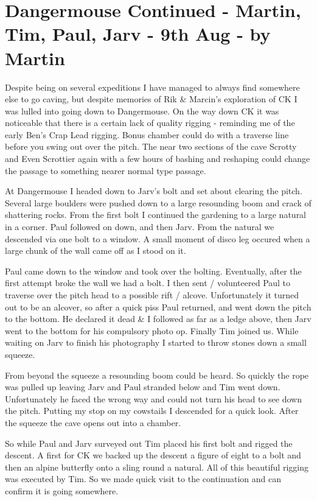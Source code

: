 
\section{Dangermouse Continued - Martin, Tim, Paul, Jarv - 9th Aug - by
Martin}\label{dangermouse-continued---martin-tim-paul-jarv---9th-aug---by-martin}

Despite being on several expeditions I have managed to always find
somewhere else to go caving, but despite memories of Rik \& Marcin's
exploration of CK I was lulled into going down to Dangermouse. On the
way down CK it was noticeable that there is a certain lack of quality
rigging - reminding me of the early Ben's Crap Lead rigging. Bonus
chamber could do with a traverse line before you swing out over the
pitch. The near two sections of the cave Scrotty and Even Scrottier
again with a few hours of bashing and reshaping could change the passage
to something nearer normal type passage.

At Dangermouse I headed down to Jarv's bolt and set about clearing the
pitch. Several large boulders were pushed down to a large resounding
boom and crack of shattering rocks. From the first bolt I continued the
gardening to a large natural in a corner. Paul followed on down, and
then Jarv. From the natural we descended via one bolt to a window. A
small moment of disco leg occured when a large chunk of the wall came
off as I stood on it.

Paul came down to the window and took over the bolting. Eventually,
after the first attempt broke the wall we had a bolt. I then sent /
volunteered Paul to traverse over the pitch head to a possible rift /
alcove. Unfortunately it turned out to be an alcover, so after a quick
piss Paul returned, and went down the pitch to the bottom. He declared
it dead \& I followed as far as a ledge above, then Jarv went to the
bottom for his compulsory photo op. Finally Tim joined us. While waiting
on Jarv to finish his photography I started to throw stones down a small
squeeze.

From beyond the squeeze a resounding boom could be heard. So quickly the
rope was pulled up leaving Jarv and Paul stranded below and Tim went
down. Unfortunately he faced the wrong way and could not turn his head
to see down the pitch. Putting my stop on my cowstails I descended for a
quick look. After the squeeze the cave opens out into a chamber.

So while Paul and Jarv surveyed out Tim placed his first bolt and rigged
the descent. A first for CK we backed up the descent a figure of eight
to a bolt and then an alpine butterfly onto a sling round a natural. All
of this beautiful rigging was executed by Tim. So we made quick visit to
the continuation and can confirm it is going somewhere.

